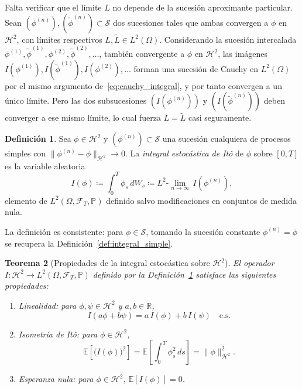 \documentclass[11pt,a4paper,oneside]{report}
\theoremstyle{plain}
\newtheorem{teorema}{Teorema}[chapter]
\theoremstyle{definition}
\newtheorem{definicion}[teorema]{Definición}
\theoremstyle{remark}
\newcommand{\R}{\mathbb{R}}
\newcommand{\E}{\mathbb{E}}
\newcommand{\PP}{\mathbb{P}}
\newcommand{\F}{\mathcal{F}}
\newcommand{\1}{\mathbf{1}}
\newcommand{\eqdef}{\coloneqq}
\begin{document}
Falta verificar que el límite $L$ no depende de la sucesión
aproximante particular. Sean $(\phi^{(n)}), (\widetilde{\phi}^{(n)})
\subset \mathcal{S}$ dos sucesiones tales que ambas convergen a $\phi$
en $\mathcal{H}^2$, con límites respectivos $L, \widetilde{L} \in
L^2(\Omega)$. Considerando la sucesión intercalada $\phi^{(1)},
\widetilde{\phi}^{(1)}, \phi^{(2)}, \widetilde{\phi}^{(2)}, \ldots$,
también convergente a $\phi$ en $\mathcal{H}^2$, las imágenes
$I(\phi^{(1)}), I(\widetilde{\phi}^{(1)}), I(\phi^{(2)}), \ldots$
forman una sucesión de Cauchy en $L^2(\Omega)$ por el mismo argumento
de~\eqref{eq:cauchy_integral}, y por tanto convergen a un único
límite. Pero las dos subsucesiones $(I(\phi^{(n)}))$ y
$(I(\widetilde{\phi}^{(n)}))$ deben converger a ese mismo límite, lo
cual fuerza $L = \widetilde{L}$ casi seguramente.

\begin{definicion}
\label{def:integral_H2}
Sea $\phi \in \mathcal{H}^2$ y $(\phi^{(n)}) \subset \mathcal{S}$ una
sucesión cualquiera de procesos simples con $\|\phi^{(n)} -
\phi\|_{\mathcal{H}^2} \to 0$. La \emph{integral estocástica de Itô}
de $\phi$ sobre $[0, T]$ es la variable aleatoria
\begin{equation*}
  I(\phi) \eqdef \int_0^T \phi_s\, dW_s
            \eqdef L^2\text{-}\!\lim_{n \to \infty}\, I(\phi^{(n)}),
\end{equation*}
elemento de $L^2(\Omega, \F_T, \PP)$ definido salvo modificaciones en
conjuntos de medida nula.
\end{definicion}

La definición es consistente: para $\phi \in \mathcal{S}$, tomando la
sucesión constante $\phi^{(n)} = \phi$ se recupera la
Definición~\ref{def:integral_simple}.

\begin{teorema}[Propiedades de la integral estocástica sobre $\mathcal{H}^2$]
\label{teo:propiedades_integral_H2}
El operador $I : \mathcal{H}^2 \to L^2(\Omega, \F_T, \PP)$ definido
por la Definición~\ref{def:integral_H2} satisface las siguientes
propiedades:
\begin{enumerate}[label=\textnormal{(\roman*)}]
  \item \emph{Linealidad:} para $\phi, \psi \in \mathcal{H}^2$ y $a, b
        \in \R$,
        \begin{equation*}
          I(a\phi + b\psi) = a\, I(\phi) + b\, I(\psi)
          \quad \text{c.s.}
        \end{equation*}
  \item \emph{Isometría de Itô:} para $\phi \in \mathcal{H}^2$,
        \begin{equation}\label{eq:isometria_H2}
          \E\!\left[\bigl(I(\phi)\bigr)^{\!2}\right]
          = \E\!\left[\int_0^T \phi_s^2\, ds\right]
          = \|\phi\|_{\mathcal{H}^2}^2.
        \end{equation}
  \item \emph{Esperanza nula:} para $\phi \in \mathcal{H}^2$,
        $\E[I(\phi)] = 0$.
\end{enumerate}
\end{teorema}
\end{document}
